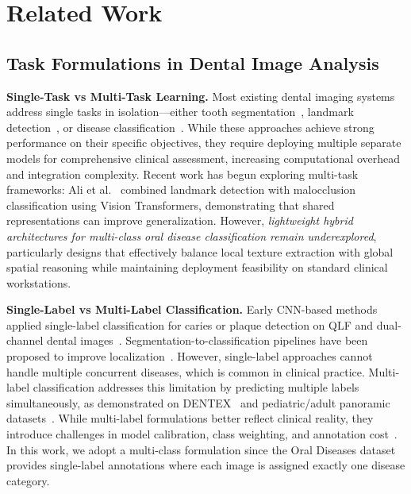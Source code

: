 \section{Related Work}
\label{sec:related}

\subsection{Task Formulations in Dental Image Analysis}
\label{subsec:tasks}

\textbf{Single-Task vs Multi-Task Learning.} Most existing dental imaging systems address single tasks in isolation---either tooth segmentation~\cite{li2021deep}, landmark detection~\cite{ali2025interpretable}, or disease classification~\cite{lee2017qlf,zhang2020dualchannel}. While these approaches achieve strong performance on their specific objectives, they require deploying multiple separate models for comprehensive clinical assessment, increasing computational overhead and integration complexity. Recent work has begun exploring multi-task frameworks: Ali et al.~\cite{ali2025interpretable} combined landmark detection with malocclusion classification using Vision Transformers, demonstrating that shared representations can improve generalization. However, \textit{lightweight hybrid architectures for multi-class oral disease classification remain underexplored}, particularly designs that effectively balance local texture extraction with global spatial reasoning while maintaining deployment feasibility on standard clinical workstations.

\textbf{Single-Label vs Multi-Label Classification.} Early CNN-based methods applied single-label classification for caries or plaque detection on QLF and dual-channel dental images~\cite{lee2017qlf,zhang2020dualchannel}. Segmentation-to-classification pipelines have been proposed to improve localization~\cite{nguyen2022caries}. However, single-label approaches cannot handle multiple concurrent diseases, which is common in clinical practice. Multi-label classification addresses this limitation by predicting multiple labels simultaneously, as demonstrated on DENTEX~\cite{hamamci2023dentex} and pediatric/adult panoramic datasets~\cite{alsakar2024multilabel}. While multi-label formulations better reflect clinical reality, they introduce challenges in model calibration, class weighting, and annotation cost~\cite{lof2ml2025}. In this work, we adopt a multi-class formulation since the Oral Diseases dataset provides single-label annotations where each image is assigned exactly one disease category.

